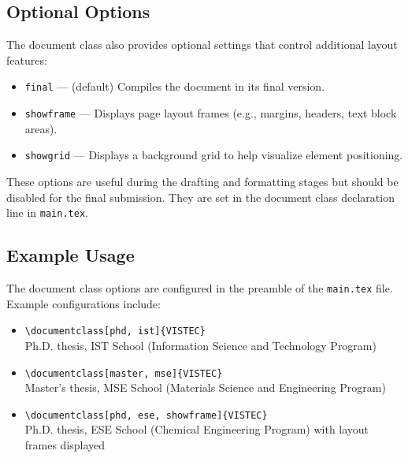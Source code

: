 \subsection{Optional Options}
\begin{subparagraph}
The document class also provides optional settings that control additional layout features:

\begin{itemize}[leftmargin=\subparitemindent]
    \item \texttt{final} — (default) Compiles the document in its final version.
    \item \texttt{showframe} — Displays page layout frames (e.g., margins, headers, text block areas).
    \item \texttt{showgrid} — Displays a background grid to help visualize element positioning.
\end{itemize}

These options are useful during the drafting and formatting stages but should be disabled for the final submission. They are set in the document class declaration line in \texttt{main.tex}.
\end{subparagraph}

\subsection{Example Usage}
\begin{subparagraph}
The document class options are configured in the preamble of the \texttt{main.tex} file. Example configurations include:

\begin{itemize}[leftmargin=\subparitemindent]
    \item \texttt{\textbackslash documentclass[phd, ist]\{VISTEC\}}\\Ph.D. thesis, IST School (Information Science and Technology Program)
    \item \texttt{\textbackslash documentclass[master, mse]\{VISTEC\}}\\Master’s thesis, MSE School (Materials Science and Engineering Program)
    \item \texttt{\textbackslash documentclass[phd, ese, showframe]\{VISTEC\}}\\Ph.D. thesis, ESE School (Chemical Engineering Program) with layout frames displayed
\end{itemize}

\end{subparagraph}

